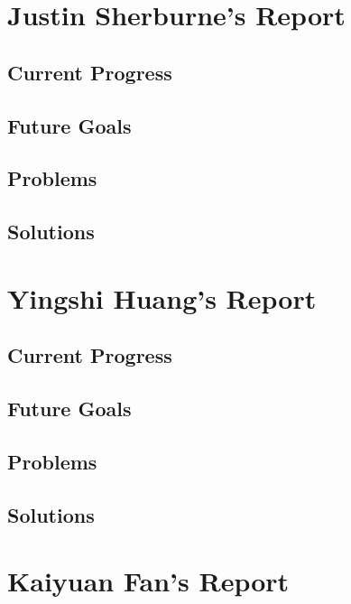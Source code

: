 \documentclass[onecolumn, draftclsnofoot,10pt, compsoc]{IEEEtran}
\begin{document}
\section{Justin Sherburne's Report}

\subsection{Current Progress}

\subsection{Future Goals}

\subsection{Problems}

\subsection{Solutions}







\section{Yingshi Huang's Report}

\subsection{Current Progress}

\subsection{Future Goals}

\subsection{Problems}

\subsection{Solutions}





\section{Kaiyuan Fan's Report}
\end{document}
